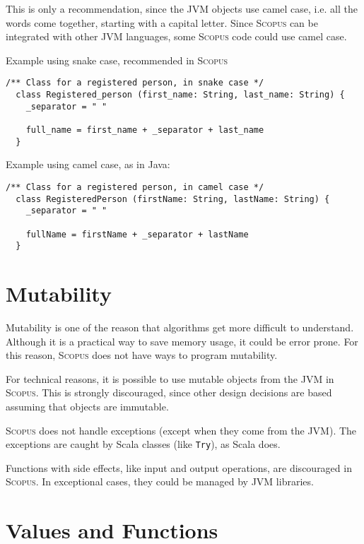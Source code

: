 \documentclass[12pt,a4paper]{book}
\newcommand{\srccode}[1]{\texttt{{#1}}}
\newcommand{\Scopus}{\textsc{Scopus}\xspace}
\begin{document}
    This is only a recommendation, since the JVM objects use camel case, i.e. all the words come together, starting with a capital letter.
    Since \Scopus can be integrated with other JVM languages, some \Scopus code could use camel case.

    Example using snake case, recommended in \Scopus

    \begin{lstlisting}[label={lst:exampleExtendsSnakeCase}]
  /** Class for a registered person, in snake case */
  class Registered_person (first_name: String, last_name: String) {
    _separator = " "

    full_name = first_name + _separator + last_name
  }
    \end{lstlisting}

    Example using camel case, as in Java:
    \begin{lstlisting}[label={lst:exampleExtendsCamelCase}]
  /** Class for a registered person, in camel case */
  class RegisteredPerson (firstName: String, lastName: String) {
    _separator = " "

    fullName = firstName + _separator + lastName
  }
    \end{lstlisting}


    \section{Mutability}

    Mutability is one of the reason that algorithms get more difficult to understand.
    Although it is a practical way to save memory usage, it could be error prone.
    For this reason, \Scopus does not have ways to program mutability.

    For technical reasons, it is possible to use mutable objects from the JVM in \Scopus.
    This is strongly discouraged, since other design decisions are based assuming that objects are immutable.

    \Scopus does not handle exceptions (except when they come from the JVM).
    The exceptions are caught by Scala classes (like \srccode{Try}), as Scala does.

    Functions with side effects, like input and output operations, are discouraged in \Scopus.
    In exceptional cases, they could be managed by JVM libraries.


    \section{Values and Functions}
\end{document}
